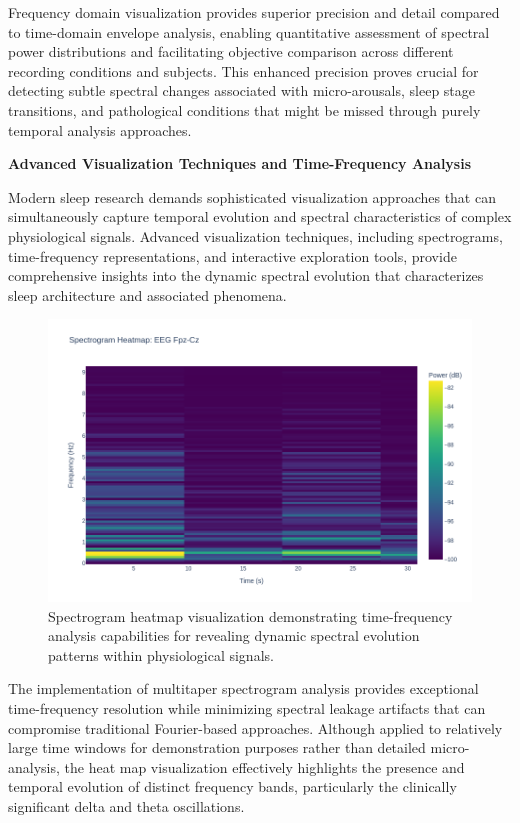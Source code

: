 \documentclass[a4paper,12pt,twoside]{article}
\begin{document}
Frequency domain visualization provides superior precision and detail compared to time-domain envelope analysis, enabling quantitative assessment of spectral power distributions and facilitating objective comparison across different recording conditions and subjects. This enhanced precision proves crucial for detecting subtle spectral changes associated with micro-arousals, sleep stage transitions, and pathological conditions that might be missed through purely temporal analysis approaches.

\textbf{Advanced Visualization Techniques and Time-Frequency Analysis}

Modern sleep research demands sophisticated visualization approaches that can simultaneously capture temporal evolution and spectral characteristics of complex physiological signals. Advanced visualization techniques, including spectrograms, time-frequency representations, and interactive exploration tools, provide comprehensive insights into the dynamic spectral evolution that characterizes sleep architecture and associated phenomena.

\begin{figure}[H]
  \centering
  \includegraphics[width=0.9\linewidth]{img/spectrogram heatmap}
  \caption{Spectrogram heatmap visualization demonstrating time-frequency analysis capabilities for revealing dynamic spectral evolution patterns within physiological signals.}
  \label{fig:spectrogram_heatmap}
\end{figure}

The implementation of multitaper spectrogram analysis provides exceptional time-frequency resolution while minimizing spectral leakage artifacts that can compromise traditional Fourier-based approaches. Although applied to relatively large time windows for demonstration purposes rather than detailed micro-analysis, the heat map visualization effectively highlights the presence and temporal evolution of distinct frequency bands, particularly the clinically significant delta and theta oscillations.
\end{document}
